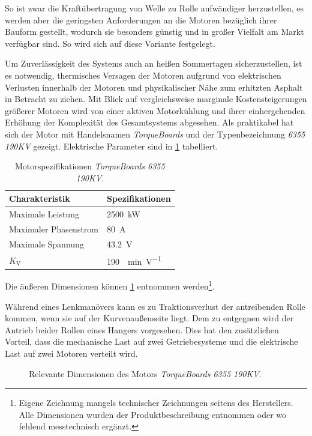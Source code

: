 	So ist zwar die Kraftübertragung von Welle zu Rolle aufwändiger herzustellen, es werden aber die geringsten Anforderungen an die Motoren bezüglich ihrer Bauform gestellt, wodurch sie besonders günstig und in großer Vielfalt am Markt verfügbar sind. So wird sich auf diese Variante festgelegt.\par\medskip
	Um Zuverlässigkeit des Systems auch an heißen Sommertagen sicherzustellen, ist es notwendig, thermisches Versagen der Motoren aufgrund von elektrischen Verlusten innerhalb der Motoren und physikalischer Nähe zum erhitzten Asphalt in Betracht zu ziehen.
	Mit Blick auf vergleichsweise marginale Kostensteigerungen größerer Motoren wird von einer aktiven Motorkühlung und ihrer einhergehenden Erhöhung der Komplexität des Gesamtsystems abgesehen.
	Als praktikabel hat sich der Motor mit Handelsnamen \textit{TorqueBoards} und der Typenbezeichnung \textit{6355 190KV} gezeigt.
	Elektrische Parameter sind in \cref{tab:TB 6355 190KV electrical specs} tabelliert.
	\begin{table}[h]
		\centering
		\caption[Motorspezifikationen \textit{TorqueBoards 6355 190KV}]{Motorspezifikationen \textit{TorqueBoards 6355 190KV}.}%
		\label{tab:TB 6355 190KV electrical specs}
		\begin{tabular}{p{}l}
			\toprule
			Charakteristik					& Spezifikationen\\ \midrule
			Maximale Leistung				& \qty{2500}{\kilo\watt}\\
			Maximaler Phasenstrom			& \qty{80}{\ampere}\\
			Maximale Spannung				& \qty{43,2}{\volt}\\
			\(K_\text{V}\)					& \qty{190}{\per\minute\per\volt}\\ \bottomrule
		\end{tabular}
	\end{table}
	Die äußeren Dimensionen können \cref{fig:motor} entnommen werden\footnote{\hspace{1mm} Eigene Zeichnung mangels technischer Zeichnungen seitens des Herstellers.
	Alle Dimensionen wurden der Produktbeschreibung entnommen oder wo fehlend messtechnisch ergänzt.}.
	
	Während eines Lenkmanövers kann es zu Traktionsverlust der antreibenden Rolle kommen, wenn sie auf der Kurvenaußenseite liegt.
	Dem zu entgegnen wird der Antrieb beider Rollen eines Hangers vorgesehen.
	Dies hat den zusätzlichen Vorteil, dass die mechanische Last auf zwei Getriebesysteme und die elektrische Last auf zwei Motoren verteilt wird.
	\begin{figure}[h]
		\centering
		
		\caption{Relevante Dimensionen des Motors \textit{TorqueBoards 6355 190KV}.}%
		\label{fig:motor}
	\end{figure}
